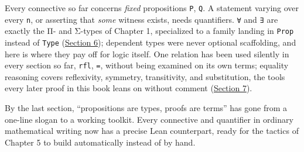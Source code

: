 Every connective so far concerns \emph{fixed} propositions \texttt{P}, \texttt{Q}. A statement varying over every \texttt{n}, or asserting that \emph{some} witness exists, needs quantifiers. \texttt{∀} and \texttt{∃} are exactly the Π- and Σ-types of Chapter 1, specialized to a family landing in \texttt{Prop} instead of \texttt{Type} (\hyperref[sec:04-propositions-and-proofs:06-quantifiers:1]{Section 6}); dependent types were never optional scaffolding, and here is where they pay off for logic itself. One relation has been used silently in every section so far, \texttt{rfl}, \texttt{=}, without being examined on its own terms; equality reasoning covers reflexivity, symmetry, transitivity, and substitution, the tools every later proof in this book leans on without comment (\hyperref[sec:04-propositions-and-proofs:07-equality:1]{Section 7}).

By the last section, ``propositions are types, proofs are terms'' has gone from a one-line slogan to a working toolkit. Every connective and quantifier in ordinary mathematical writing now has a precise Lean counterpart, ready for the tactics of Chapter 5 to build automatically instead of by hand.










